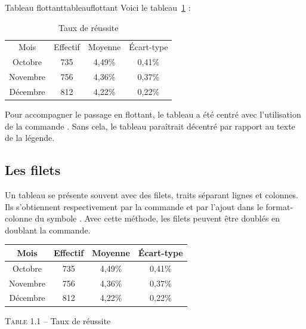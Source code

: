 \begin{codedoublefaux}{Tableau flottant}{tableauflottant}
Voici le tableau~\ref{tablo} :
\begin{table}[!ht]
\centering
\begin{tabular}{cccc}
Mois            & Effectif     & Moyenne      & \'{E}cart-type  \\
Octobre         & 735          & 4,49\%       & 0,41\%          \\
Novembre        & 756          & 4,36\%       & 0,37\%          \\
Décembre        & 812          & 4,22\%       & 0,22\%          \\ 
\end{tabular}
\caption{Taux de réussite}  \label{tablo}
\end{table}
\end{codedoublefaux}

Pour accompagner le passage en flottant, le tableau a été centré avec l'utilisation de la commande . Sans cela, le tableau paraîtrait décentré par rapport au texte de la légende.

\subsection{Les filets}

Un tableau se présente souvent avec des filets, traits séparant lignes et colonnes. Ils s'obtiennent respectivement par la commande  et par l'ajout dans le format-colonne du symbole \og \macron{|} \fg. Avec cette méthode, les filets peuvent être doublés en doublant la commande.

\begin{codedoublevrai}
\centering
\begin{tabular}{|c||c|c|c|}
\hline 
Mois            & Effectif     & Moyenne      & \'{E}cart-type  \\ \hline \hline
Octobre         & 735          & 4,49\%       & 0,41\%          \\ \hline
Novembre        & 756          & 4,36\%       & 0,37\%          \\ \hline
Décembre        & 812          & 4,22\%       & 0,22\%          \\ \hline
\end{tabular}

\vspace{\baselineskip}
\textsc{Table 1.1} -- Taux de réussite
\end{codedoublevrai}

